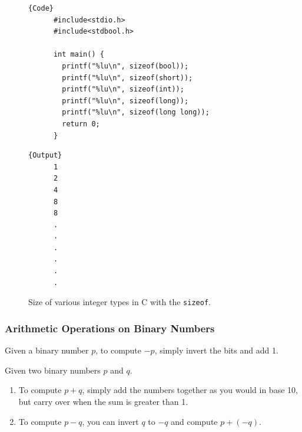   \begin{figure}[H]
    \centering 
    \noindent\begin{minipage}{.5\textwidth}
    \begin{lstlisting}[]{Code}
      #include<stdio.h>
      #include<stdbool.h>

      int main() {
        printf("%lu\n", sizeof(bool)); 
        printf("%lu\n", sizeof(short)); 
        printf("%lu\n", sizeof(int)); 
        printf("%lu\n", sizeof(long)); 
        printf("%lu\n", sizeof(long long)); 
        return 0; 
      }
    \end{lstlisting}
    \end{minipage}
    \hfill
    \begin{minipage}{.49\textwidth}
    \begin{lstlisting}[]{Output}
      1
      2
      4
      8
      8
      .
      .
      .
      .
      .
      .
    \end{lstlisting}
    \end{minipage}
    \caption{Size of various integer types in C with the \texttt{sizeof}.} 
    \label{fig:integer_size}
  \end{figure}


  \subsubsection{Arithmetic Operations on Binary Numbers}

    \begin{theorem}
      \label{thm:inversion-of-binary-numbers}
      Given a binary number $p$, to compute $-p$, simply invert the bits and add 1.
    \end{theorem}

    \begin{theorem}
      \label{thm:addition-and-subtraction-of-binary-numbers}
      Given two binary numbers $p$ and $q$. 
      \begin{enumerate}
        \item To compute $p + q$, simply add the numbers together as you would in base 10, but carry over when the sum is greater than 1. 
        \item To compute $p - q$, you can invert $q$ to $-q$ and compute $p + (-q)$. 
      \end{enumerate}
    \end{theorem}


